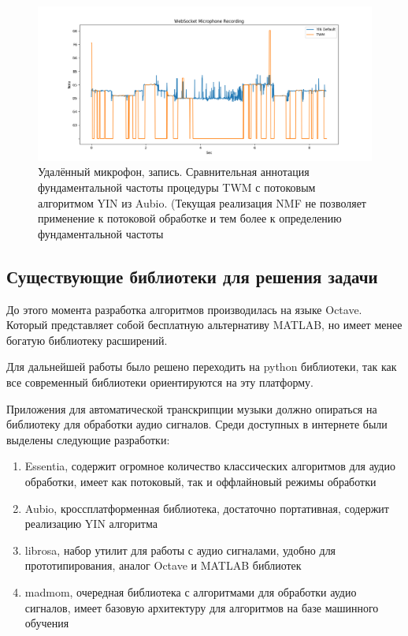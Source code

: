 \begin{figure}
  \centering
    \includegraphics[scale=.5]{res/record-twm-vs-yin.png}
  \centering
  \caption{Удалённый микрофон, запись.
    Сравнительная аннотация фундаментальной частоты процедуры
    TWM с потоковым алгоритмом YIN из Aubio.
    (Текущая реализация NMF не позволяет применение
    к потоковой обработке и тем более к определению фундаментальной
    частоты}
    \label{F:6-2-t-y-a-m}
\end{figure}

\subsection{Существующие библиотеки для решения задачи}

До этого момента разработка алгоритмов производилась на языке Octave.
Который представляет собой бесплатную альтернативу MATLAB, но имеет
менее богатую библиотеку расширений.

Для дальнейшей работы было решено переходить на python библиотеки,
так как все современный библиотеки ориентируются на эту платформу.

Приложения для автоматической транскрипции музыки должно опираться
на библиотеку для обработки аудио сигналов. Среди доступных в интернете
были выделены следующие разработки:
\begin{enumerate}
  \item Essentia, содержит огромное количество классических алгоритмов
    для аудио обработки, имеет как потоковый, так и оффлайновый режимы
    обработки
  \item Aubio, кроссплатформенная библиотека, достаточно портативная,
    содержит реализацию YIN алгоритма
  \item librosa, набор утилит для работы с аудио сигналами, удобно
    для прототипирования, аналог Octave и MATLAB библиотек
  \item madmom, очередная библиотека с алгоритмами для обработки
    аудио сигналов, имеет базовую архитектуру для алгоритмов на базе
    машинного обучения
\end{enumerate}
